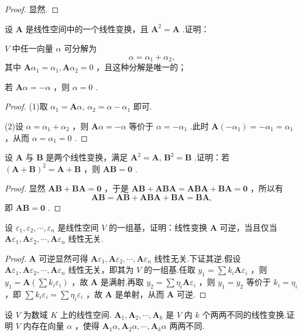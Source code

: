 \begin{proof}
	显然.
\end{proof}
\begin{prob}[16]
	设 $\bm A$ 是线性空间中的一个线性变换，且 $\bm A^2=\bm A$ .证明：
	\begin{mylist}
		\item  $V$ 中任一向量 $\alpha$ 可分解为\[\alpha=\alpha_1+\alpha_2,\]其中 $\bm A\alpha_1=\alpha_1,\bm A\alpha_2=0$ ，且这种分解是唯一的；
		\item 若 $\bm A\alpha=-\alpha$ ，则 $\alpha=0$ .
	\end{mylist}
\end{prob}
\begin{proof}
	(1)取 $\alpha_1=\bm A\alpha,\,\alpha_2=\alpha-\alpha_1$ 即可.

	(2)设 $\alpha=\alpha_1+\alpha_2$ ，则 $\bm A\alpha=-\alpha$ 等价于 $\alpha=-\alpha_1$ .此时 $\bm A(-\alpha_1)=-\alpha_1=\alpha_1$ ，从而 $\alpha=\alpha_1=0$ .
\end{proof}
\begin{prob}[17]
	设 $\bm A$ 与 $\bm B$ 是两个线性变换，满足 $\bm A^2=\bm A,\,\bm B^2=\bm B$ .证明：若 $(\bm A+\bm B)^2=\bm A+\bm B$ ，则 $\bm{AB}=\bm 0$ .
\end{prob}
\begin{proof}
	显然 $\bm{AB}+\bm{BA}=\bm 0$ ，于是 $\bm{AB}+\bm{ABA}=\bm{ABA}+\bm{BA}=\bm 0$ ，所以有
	\[
		\bm{AB}=\bm{AB}+\bm{ABA}+\bm{BA}=\bm{BA},
	\]
	即 $\bm{AB}=\bm 0$ .
\end{proof}
\begin{prob}[18]
	设 $\varepsilon_1,\varepsilon_2,\cdots,\varepsilon_n$ 是线性空间 $V$ 的一组基，证明：线性变换 $\bm A$ 可逆，当且仅当 $\bm A\varepsilon_1,\bm A\varepsilon_2,\cdots,\bm A\varepsilon_n$ 线性无关.
\end{prob}
\begin{proof}
	$\bm A$ 可逆显然可得 $\bm A\varepsilon_1,\bm A\varepsilon_2,\cdots,\bm A\varepsilon_n$ 线性无关.下证其逆.假设 $\bm A\varepsilon_1,\bm A\varepsilon_2,\cdots,\bm A\varepsilon_n$ 线性无关，即其为 $V$ 的一组基.任取 $y_1=\sum k_i\bm A\varepsilon_i$ ，则 $y_1=\bm A(\sum k_i\varepsilon_i)$ ，故 $\bm A$ 是满射.再取 $y_2=\sum \eta_i\bm A\varepsilon_i$ ，则 $y_1=y_2$ 等价于 $k_i=\eta_i$ ，即 $\sum k_i\varepsilon_i=\sum\eta_i\varepsilon_i$ ，故 $\bm A$ 是单射，从而 $\bm A$ 可逆.
\end{proof}
\begin{prob}[19]
	设 $V$ 为数域 $K$ 上的线性空间. $\bm A_1,\bm A_2,\cdots,\bm A_k$ 是 $V$ 内 $k$ 个两两不同的线性变换.证明 $V$ 内存在向量 $\alpha$ ，使得 $\bm A_1\alpha,\bm A_2\alpha,\cdots,\bm A_k\alpha$ 两两不同.
\end{prob}
